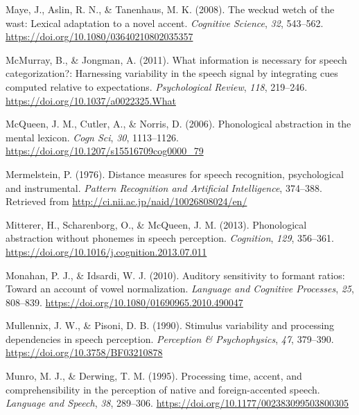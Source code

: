 \documentclass[
  11pt,
  english,
  man,floatsintext]{apa6}
\newlength{\cslhangindent}
\newlength{\cslentryspacingunit} %
\newenvironment{CSLReferences}[2] %
 {%
  \setlength{\parindent}{0pt}
  \ifodd #1
  \let\oldpar\par
  \def\par{\hangindent=\cslhangindent\oldpar}
  \fi
  \setlength{\parskip}{#2\cslentryspacingunit}
 }%
 {}
\begin{document}
\begin{CSLReferences}{1}{0}
\leavevmode{}%
Maye, J., Aslin, R. N., \& Tanenhaus, M. K. (2008). The weckud wetch of the wast: Lexical adaptation to a novel accent. \emph{Cognitive Science}, \emph{32}, 543--562. \url{https://doi.org/10.1080/03640210802035357}

\leavevmode{}%
McMurray, B., \& Jongman, A. (2011). What information is necessary for speech categorization?: Harnessing variability in the speech signal by integrating cues computed relative to expectations. \emph{Psychological Review}, \emph{118}, 219--246. \url{https://doi.org/10.1037/a0022325.What}

\leavevmode{}%
McQueen, J. M., Cutler, A., \& Norris, D. (2006). Phonological abstraction in the mental lexicon. \emph{Cogn Sci}, \emph{30}, 1113--1126. \url{https://doi.org/10.1207/s15516709cog0000_79}

\leavevmode{}%
Mermelstein, P. (1976). Distance measures for speech recognition, psychological and instrumental. \emph{Pattern Recognition and Artificial Intelligence}, 374--388. Retrieved from \url{http://ci.nii.ac.jp/naid/10026808024/en/}

\leavevmode{}%
Mitterer, H., Scharenborg, O., \& McQueen, J. M. (2013). Phonological abstraction without phonemes in speech perception. \emph{Cognition}, \emph{129}, 356--361. \url{https://doi.org/10.1016/j.cognition.2013.07.011}

\leavevmode{}%
Monahan, P. J., \& Idsardi, W. J. (2010). Auditory sensitivity to formant ratios: Toward an account of vowel normalization. \emph{Language and Cognitive Processes}, \emph{25}, 808--839. \url{https://doi.org/10.1080/01690965.2010.490047}

\leavevmode{}%
Mullennix, J. W., \& Pisoni, D. B. (1990). Stimulus variability and processing dependencies in speech perception. \emph{Perception \& Psychophysics}, \emph{47}, 379--390. \url{https://doi.org/10.3758/BF03210878}

\leavevmode{}%
Munro, M. J., \& Derwing, T. M. (1995). Processing time, accent, and comprehensibility in the perception of native and foreign-accented speech. \emph{Language and Speech}, \emph{38}, 289--306. \url{https://doi.org/10.1177/002383099503800305}


\end{CSLReferences}
\end{document}
